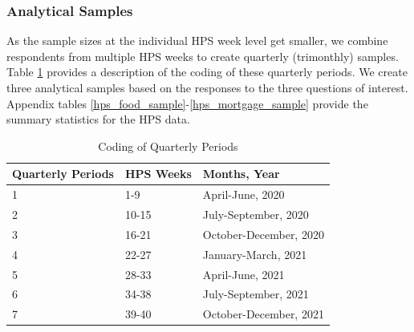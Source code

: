 \documentclass[12pt]{article}
\begin{document}
\subsubsection{Analytical Samples}
As the sample sizes at the individual HPS week level get smaller, we combine respondents from multiple HPS weeks to create quarterly (trimonthly) samples. Table \ref{table:period.table} provides a description of the coding of these quarterly periods. We create three analytical samples based on the responses to the three questions of interest. Appendix tables \ref{hps_food_sample}-\ref{hps_mortgage_sample} provide the summary statistics for the HPS data.   

\begin{table}[ht]
\centering
\caption{Coding of Quarterly Periods}\label{table:period.table}
\begin{tabular}{lll}
\hline
\textbf{Quarterly Periods} & \textbf{HPS Weeks} & \textbf{Months, Year} \\
\hline
1                          & 1-9                  & April-June, 2020               \\
2                          & 10-15                & July-September, 2020           \\
3                          & 16-21                & October-December, 2020         \\
4                          & 22-27                & January-March, 2021            \\
5                          & 28-33                & April-June, 2021               \\
6                          & 34-38                & July-September, 2021           \\
7                          & 39-40                & October-December, 2021\\
\hline
\end{tabular}
\end{table}
\end{document}
